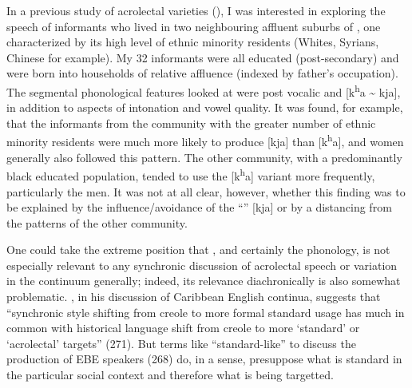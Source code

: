 In a previous study of acrolectal varieties (\citealt{Irvine1988,Irvine1994}), I was interested in exploring the speech of informants who lived in two neighbouring affluent suburbs of , one characterized by its high level of ethnic minority residents (Whites, Syrians, Chinese for example).  My 32 informants were all educated (post-secondary) and were born into households of relative affluence (indexed by father’s occupation).  The segmental phonological features looked at were post vocalic  and [k\textsuperscript{h}a {\textasciitilde} kja], in addition to aspects of intonation and vowel quality.  It was found, for example, that the informants from the community with the greater number of ethnic minority residents were much more likely to produce [kja] than [k\textsuperscript{h}a], and women generally also followed this pattern.  The other community, with a predominantly black educated population, tended to use the [k\textsuperscript{h}a] variant more frequently, particularly the men.  It was not at all clear, however, whether this finding was to be explained by the influence\slash avoidance of the “” [kja] or by a distancing from the patterns of the other community.  

  One could take the extreme position that , and certainly the phonology, is not especially relevant to any synchronic discussion of acrolectal speech or variation in the continuum generally; indeed, its relevance diachronically is also somewhat problematic.  \citet{Winford1997}, in his discussion of Caribbean English continua, suggests that “synchronic style shifting from creole  to more formal standard usage has much in common with historical language shift from creole to more ‘standard’ or ‘acrolectal’ targets” (271).  But terms like “standard-like” to discuss the production of EBE speakers (268) do, in a sense, presuppose what is standard in the particular social context and therefore what is being targetted.

